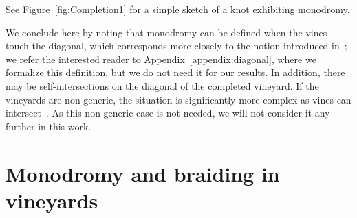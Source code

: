 \documentclass[twoside,leqno]{article}
\begin{document}
See Figure~\ref{fig:Completion1} for a simple sketch of a knot exhibiting monodromy.  

We conclude here by noting that monodromy can be defined when the vines touch the diagonal, which corresponds more closely to the notion introduced in~\cite{Arya2024}; we refer the interested reader to Appendix~\ref{appendix:diagonal}, where we formalize this definition, but we do not need it for our results.
In addition, there may be self-intersections on the diagonal of the completed vineyard. If the vineyards are non-generic, the situation is significantly more complex as vines can intersect~\cite{turner2023representing}.  As this non-generic case is not needed, we will not consider it any further in this work.

\section{Monodromy and braiding in vineyards}
\end{document}
